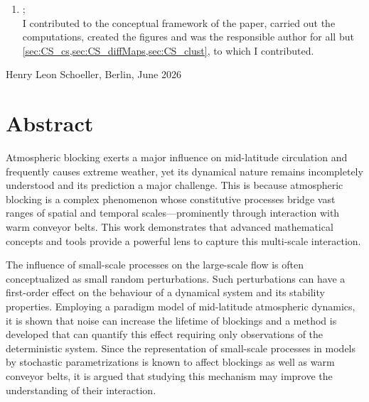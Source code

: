 \begin{center}
\begin{enumerate}
          computations, prepared the figures and wrote the manuscript.
    \item {};\\[0.5em]
          I contributed to the conceptual framework of the paper, carried
          out the computations, created the figures and was the responsible author
          for all but \cref{sec:CS_cs,sec:CS_diffMaps,sec:CS_clust}, to which I
          contributed.
\end{enumerate}
\vfill
\noindent
Henry Leon Schoeller, Berlin, June 2026
\cleardoublepage

\chapter*{Abstract}

Atmospheric blocking exerts a major influence on mid-latitude circulation
and frequently causes extreme weather, yet its
dynamical nature remains incompletely understood and its prediction a major
challenge. This is because atmospheric blocking is a complex phenomenon whose
constitutive
processes bridge vast ranges of spatial and temporal scales---prominently
through interaction with warm conveyor belts. This work demonstrates that
advanced mathematical concepts and tools provide a powerful lens to capture
this multi-scale interaction.

The influence of small-scale processes on the large-scale flow is often
conceptualized as small random perturbations. Such perturbations can have a
first-order effect on the behaviour of a dynamical system and its stability
properties. Employing a paradigm model of mid-latitude
atmospheric dynamics, it is shown that noise can increase the lifetime of
blockings and a method is developed that can quantify this effect requiring
only observations of the deterministic system. Since the representation of
small-scale processes in models by stochastic parametrizations is known to
affect blockings as well as warm conveyor belts, it is argued that
studying this mechanism may improve the
understanding of their interaction.


\end{center}
